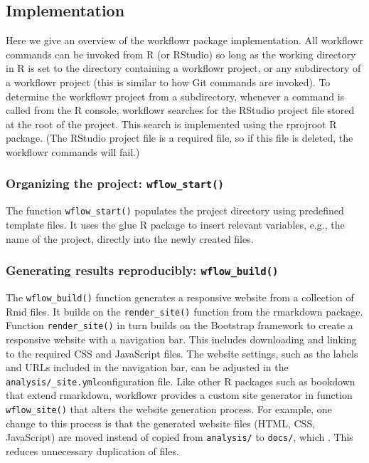\documentclass[9pt,a4paper]{extarticle}
\begin{document}
\subsection*{Implementation}

Here we give an overview of the workflowr package implementation. All workflowr commands can be invoked from R (or RStudio) so long as the working directory in R is set to the directory containing a workflowr project, or any subdirectory of a workflowr project (this is similar to how Git commands are invoked). To determine the workflowr project from a subdirectory, whenever a command is called from the R console, workflowr searches for the RStudio project file stored at the root of the project. This search is implemented using the rprojroot R package. (The RStudio project file is a required file, so if this file is deleted, the workflowr commands will fail.)

\subsubsection*{Organizing the project: \texttt{wflow\_start()}}

The function \texttt{wflow\_start()} populates the project directory using
predefined template files. It uses the glue R package to insert relevant
variables, e.g., the name of the project, directly into the newly
created files.

\subsubsection*{Generating results reproducibly: \texttt{wflow\_build()}}

The \texttt{wflow\_build()} function generates a responsive website from a
collection of Rmd files. It builds on the \texttt{render\_site()} function from
the rmarkdown package. Function \texttt{render\_site()} in turn builds on the
Bootstrap framework to create a responsive website with a navigation
bar. This includes downloading and linking to the required CSS and
JavaScript files. The website settings, such as the labels and URLs
included in the navigation bar, can be adjusted in the
\verb|analysis/_site.yml|configuration file. Like other R packages such
as bookdown that extend rmarkdown, workflowr provides a custom site
generator in function \texttt{wflow\_site()} that alters the website generation
process. For example, one change to this process is that the generated
website files (HTML, CSS, JavaScript) are moved instead of copied from
\verb|analysis/| to \verb|docs/|, which . This reduces unnecessary
duplication of files.
\end{document}

